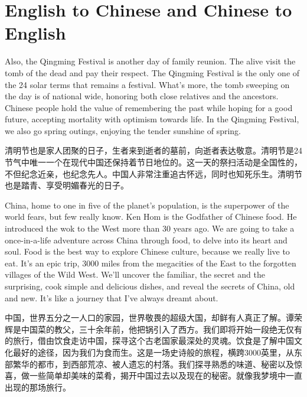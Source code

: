 \section{English to Chinese and Chinese to English}

\begin{part}{}{}
    Also, the Qingming Festival is another day of family reunion. The alive visit the tomb of the dead and pay their respect. The Qingming Festival is the only one of the 24 solar terms that remains a festival. What's more, the tomb sweeping on the day is of national wide, honoring both close relatives and the ancestors. Chinese people hold the value of remembering the past while hoping for a good future, accepting mortality with optimism towards life. In the Qingming Festival, we also go spring outings, enjoying the tender sunshine of spring.

    清明节也是家人团聚的日子，生者来到逝者的墓前，向逝者表达敬意。清明节是24节气中唯一一个在现代中国还保持着节日地位的。这一天的祭扫活动是全国性的，不但纪念近亲，也纪念先人。中国人非常注重追古怀远，同时也知死乐生。清明节也是踏青、享受明媚春光的日子。
\end{part}

\begin{part}{}{}
    China, home to one in five of the planet's population, is the superpower of the world fears, but few really know. Ken Hom is the Godfather of Chinese food. He introduced the wok to the West more than 30 years ago. We are going to take a once-in-a-life adventure across China through food, to delve into its heart and soul. Food is the best way to explore Chinese culture, because we really live to eat. It's an epic trip, 3000 miles from the megacities of the East to the forgotten villages of the Wild West. We'll uncover the familiar, the secret and the surprising, cook simple and delicious dishes, and reveal the secrets of China, old and new. It's like a journey that I've always dreamt about.

    中国，世界五分之一人口的家园，世界敬畏的超级大国，却鲜有人真正了解。谭荣辉是中国菜的教父，三十余年前，他把锅引入了西方。我们即将开始一段绝无仅有的旅行，借由饮食走访中国，探寻这个古老国家最深处的灵魂。饮食是了解中国文化最好的途径，因为我们为食而生。这是一场史诗般的旅程，横跨3000英里，从东部繁华的都市，到西部荒凉、被人遗忘的村落。我们探寻熟悉的味道、秘密以及惊喜，做一些简单却美味的菜肴，揭开中国过去以及现在的秘密。就像我梦境中一直出现的那场旅行。
\end{part}

